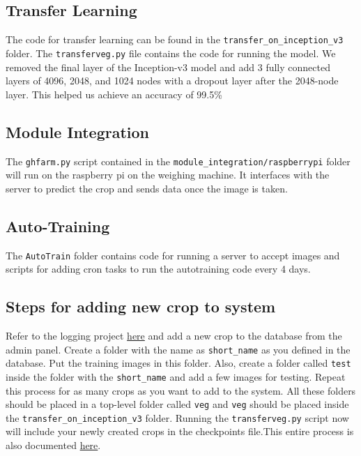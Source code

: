 \documentclass[a4paper,12pt,oneside]{book}
\begin{document}
\subsection{Transfer Learning}
The code for transfer learning can be found in the \texttt{transfer\_on\_inception\_v3} folder. The \texttt{transferveg.py} file contains the code for running the model.
We removed the final layer of the Inception-v3 model and add 3 fully connected layers of 4096, 2048, and 1024 nodes with a dropout layer after the 2048-node layer.
This helped us achieve an accuracy of 99.5\%

\subsection{Module Integration}
The \texttt{ghfarm.py} script contained in the \texttt{module\_integration/raspberrypi} folder will run on the raspberry pi on the weighing machine. It interfaces with the server to predict the crop and sends data once the image is taken.

\subsection{Auto-Training}
The \texttt{AutoTrain} folder contains code for running a server to accept images and scripts for adding cron tasks to run the autotraining code every 4 days.

\subsection{Steps for adding new crop to system}
Refer to the logging project \href{https://github.com/eYSIP-2017/eYSIP-2017_Development_of_Web_Interface_for_GH_Farm_Produce}{here} and add a new crop to the database from the admin panel. Create a folder with the name as \texttt{short\_name} as you defined in the database. Put the training images in this folder. Also, create a folder called \texttt{test} inside the folder with the \texttt{short\_name} and add a few images for testing. Repeat this process for as many crops as you want to add to the system. All these folders should be placed in a top-level folder called \texttt{veg} and \texttt{veg} should be placed inside the \texttt{transfer\_on\_inception\_v3} folder. Running the \texttt{transferveg.py} script now will include your newly created crops in the checkpoints file.This entire process is also documented \href{https://github.com/eYSIP-2017/eYSIP-2017_Vegetable-Identification-Using-Transfer-Learning/wiki/Transfer-Learning}{here}.
\end{document}
